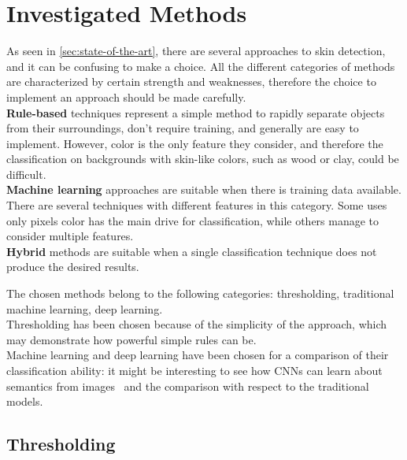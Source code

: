 \chapter{Investigated Methods}\label{chap:methods}


\noindent As seen in \ref{sec:state-of-the-art}, there are several approaches to skin detection, and it can be confusing to make a choice.
All the different categories of methods are characterized by certain strength and weaknesses, therefore the choice to implement an approach should be made carefully.\\
\textbf{Rule-based} techniques represent a simple method to rapidly separate objects from their surroundings, don't require training, and generally are easy to implement.
However, color is the only feature they consider, and therefore the classification on backgrounds with skin-like colors, such as wood or clay, could be difficult.\\
\textbf{Machine learning} approaches are suitable when there is training data available.
There are several techniques with different features in this category.
Some uses only pixels color has the main drive for classification, while others manage to consider multiple features.\\
\textbf{Hybrid} methods are suitable when a single classification technique does not produce the desired results.

The chosen methods belong to the following categories: thresholding, traditional machine learning, deep learning.\\
Thresholding has been chosen because of the simplicity of the approach, which may demonstrate how powerful simple rules can be.\\
Machine learning and deep learning have been chosen for a comparison of their classification ability: it might be interesting to see how CNNs can learn about semantics from images~\cite{dharmaretnam2018emergence} and the comparison with respect to the traditional models.\\


\FloatBarrier
\section{Thresholding}

